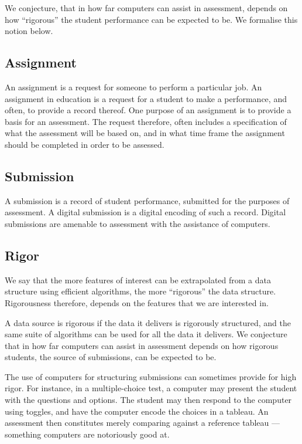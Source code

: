 We conjecture, that in how far computers can assist in assessment, depends on
how ``rigorous'' the student performance can be expected to be.  We formalise
this notion below.

\subsection{Assignment}

An assignment is a request for someone to perform a particular job.  An
assignment in education is a request for a student to make a performance, and
often, to provide a record thereof. One purpose of an assignment is to provide
a basis for an assessment. The request therefore, often includes a
specification of what the assessment will be based on, and in what time frame
the assignment should be completed in order to be assessed.

\subsection{Submission}

A submission is a record of student performance, submitted for the purposes of
assessment. A digital submission is a digital encoding of such a record.
Digital submissions are amenable to assessment with the assistance of
computers.

\subsection{Rigor}

We say that the more features of interest can be extrapolated from a data
structure using efficient algorithms, the more ``rigorous'' the data structure.
Rigorousness therefore, depends on the features that we are interested in.

A data source is rigorous if the data it delivers is rigorously structured, and
the same suite of algorithms can be used for all the data it delivers. We
conjecture that in how far computers can assist in assessment depends on how
rigorous students, the source of submissions, can be expected to be.

The use of computers for structuring submissions can sometimes provide for high
rigor. For instance, in a multiple-choice test, a computer may present the
student with the questions and options. The student may then respond to the
computer using toggles, and have the computer encode the choices in a tableau.
An assessment then constitutes merely comparing against a reference tableau ---
something computers are notoriously good at.

